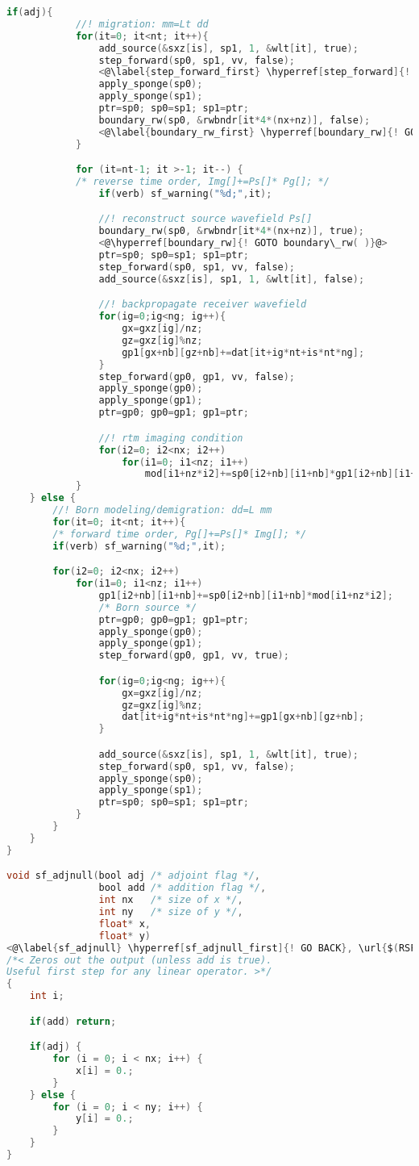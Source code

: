 \documentclass[a4paper,11pt]{article}
\theoremstyle{mytheor}
\begin{document}
\begin{lstlisting}[label={prtm2d},language=C,tabsize=4,caption=prtm2d.c]
		if(adj){
			//! migration: mm=Lt dd
			for(it=0; it<nt; it++){			
				add_source(&sxz[is], sp1, 1, &wlt[it], true);
				step_forward(sp0, sp1, vv, false);
				<@\label{step_forward_first} \hyperref[step_forward]{! GOTO step\_forward( )}@>
				apply_sponge(sp0);
				apply_sponge(sp1);
				ptr=sp0; sp0=sp1; sp1=ptr;
				boundary_rw(sp0, &rwbndr[it*4*(nx+nz)], false);
				<@\label{boundary_rw_first} \hyperref[boundary_rw]{! GOTO boundary\_rw( )}@>
			}

			for (it=nt-1; it >-1; it--) {
			/* reverse time order, Img[]+=Ps[]* Pg[]; */
				if(verb) sf_warning("%d;",it);

				//! reconstruct source wavefield Ps[]	
				boundary_rw(sp0, &rwbndr[it*4*(nx+nz)], true);
				<@\hyperref[boundary_rw]{! GOTO boundary\_rw( )}@>
				ptr=sp0; sp0=sp1; sp1=ptr;
				step_forward(sp0, sp1, vv, false);
				add_source(&sxz[is], sp1, 1, &wlt[it], false);

				//! backpropagate receiver wavefield
				for(ig=0;ig<ng; ig++){
					gx=gxz[ig]/nz;
					gz=gxz[ig]%nz;
					gp1[gx+nb][gz+nb]+=dat[it+ig*nt+is*nt*ng];
				}
				step_forward(gp0, gp1, vv, false);
				apply_sponge(gp0); 
				apply_sponge(gp1); 
				ptr=gp0; gp0=gp1; gp1=ptr;

				//! rtm imaging condition
				for(i2=0; i2<nx; i2++)
					for(i1=0; i1<nz; i1++)
						mod[i1+nz*i2]+=sp0[i2+nb][i1+nb]*gp1[i2+nb][i1+nb];
			}
	} else {
		//! Born modeling/demigration: dd=L mm
		for(it=0; it<nt; it++){	
		/* forward time order, Pg[]+=Ps[]* Img[]; */	
		if(verb) sf_warning("%d;",it);	

		for(i2=0; i2<nx; i2++)
			for(i1=0; i1<nz; i1++)
				gp1[i2+nb][i1+nb]+=sp0[i2+nb][i1+nb]*mod[i1+nz*i2];
				/* Born source */
				ptr=gp0; gp0=gp1; gp1=ptr;
				apply_sponge(gp0); 
				apply_sponge(gp1); 
				step_forward(gp0, gp1, vv, true);

				for(ig=0;ig<ng; ig++){
					gx=gxz[ig]/nz;
					gz=gxz[ig]%nz;
					dat[it+ig*nt+is*nt*ng]+=gp1[gx+nb][gz+nb];
				}

				add_source(&sxz[is], sp1, 1, &wlt[it], true);
				step_forward(sp0, sp1, vv, false);
				apply_sponge(sp0);
				apply_sponge(sp1);
				ptr=sp0; sp0=sp1; sp1=ptr;
			}	
		}
	}	 
}

void sf_adjnull(bool adj /* adjoint flag */, 
				bool add /* addition flag */, 
				int nx   /* size of x */, 
				int ny   /* size of y */, 
				float* x, 
				float* y)
<@\label{sf_adjnull} \hyperref[sf_adjnull_first]{! GO BACK}, \url{$(RSFROOT)/src/build/api/c/adjnull.c}@>
/*< Zeros out the output (unless add is true). 
Useful first step for any linear operator. >*/
{
	int i;

	if(add) return;

	if(adj) {
		for (i = 0; i < nx; i++) {
			x[i] = 0.;
		}
	} else {
		for (i = 0; i < ny; i++) {
			y[i] = 0.;
		}
	}
}
\end{lstlisting}
\end{document}
